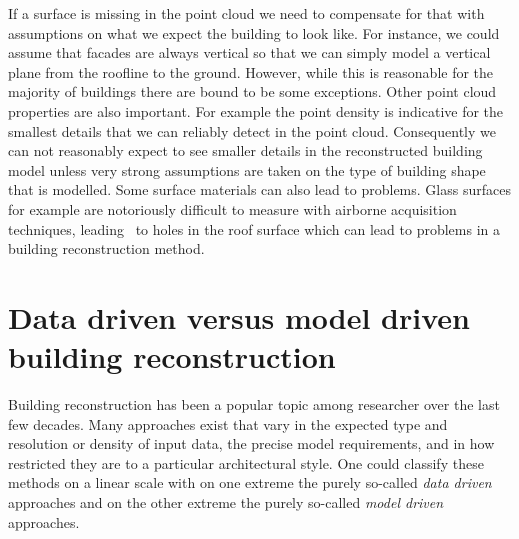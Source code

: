 If a surface is missing in the point cloud we need to compensate for that with assumptions on what we expect the building to look like. 
For instance, we could assume that facades are always vertical so that we can simply model a vertical plane from the roofline to the ground. 
However, while this is reasonable for the majority of buildings there are bound to be some exceptions.
Other point cloud properties are also important. For example the point density is indicative for the smallest details that we can reliably detect in the point cloud. Consequently we can not reasonably expect to see smaller details in the reconstructed building model unless very strong assumptions are taken on the type of building shape that is modelled. Some surface materials can also lead to problems. Glass surfaces for example are notoriously difficult to measure with airborne acquisition techniques, leading \eg\ to holes in the roof surface which can lead to problems in a building reconstruction method.


%
\section{Data driven versus model driven building reconstruction}
Building reconstruction has been a popular topic among researcher over the last few decades. 
Many approaches exist that vary in the expected type and resolution or density of input data, the precise model requirements, and in how restricted they are to a particular architectural style.
One could classify these methods on a linear scale with on one extreme the purely so-called \emph{data  driven} approaches and on the other extreme the purely so-called \emph{model driven} approaches.

